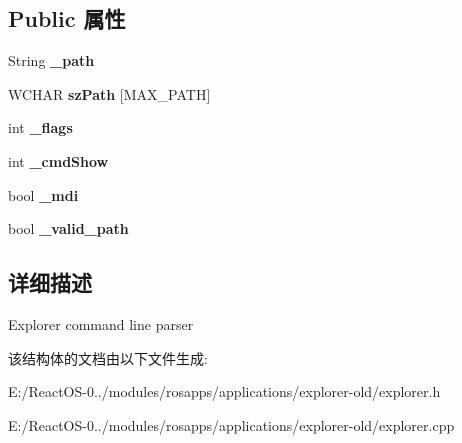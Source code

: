 \subsection*{Public 属性}
\begin{DoxyCompactItemize}
\item 
\mbox{\label{struct_explorer_cmd_aeccba8e416c8b981043d4adaab06e051}} 
String {\bfseries \+\_\+path}
\item 
\mbox{\label{struct_explorer_cmd_ad2b5f55ecbe194aff0c29390546ac5fc}} 
W\+C\+H\+AR {\bfseries sz\+Path} \mbox{[}M\+A\+X\+\_\+\+P\+A\+TH\mbox{]}
\item 
\mbox{\label{struct_explorer_cmd_a0362b73d6d6ad77a3e43078a91dc7c08}} 
int {\bfseries \+\_\+flags}
\item 
\mbox{\label{struct_explorer_cmd_a76ddb55cd057535761aee1391ebb9e7e}} 
int {\bfseries \+\_\+cmd\+Show}
\item 
\mbox{\label{struct_explorer_cmd_a5f1fd612970e9c032df746ccc8e46d57}} 
bool {\bfseries \+\_\+mdi}
\item 
\mbox{\label{struct_explorer_cmd_a1e59495e18742b06212d175f54177015}} 
bool {\bfseries \+\_\+valid\+\_\+path}
\end{DoxyCompactItemize}


\subsection{详细描述}
Explorer command line parser 

该结构体的文档由以下文件生成\+:\begin{DoxyCompactItemize}
\item 
E\+:/\+React\+O\+S-\/0../modules/rosapps/applications/explorer-\/old/explorer.\+h\item 
E\+:/\+React\+O\+S-\/0../modules/rosapps/applications/explorer-\/old/explorer.\+cpp\end{DoxyCompactItemize}

